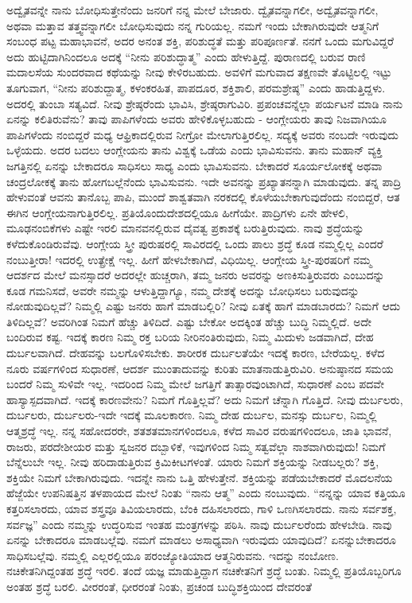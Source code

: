 ಅದ್ವೈತವನ್ನೇ ನಾನು ಬೋಧಿಸುತ್ತೇನೆಂದು ಜನರಿಗೆ ನನ್ನ ಮೇಲೆ ಬೇಜಾರು. ದ್ವೈತವನ್ನಾಗಲೀ, ಅದ್ವೈತವನ್ನಾಗಲೀ, ಅಥವಾ ಮತ್ತಾವ ತತ್ತ್ವವನ್ನಾಗಲೀ ಬೋಧಿಸುವುದು ನನ್ನ ಗುರಿಯಲ್ಲ. ನಮಗೆ ಇಂದು ಬೇಕಾಗಿರುವುದೇ ಆತ್ಮನಿಗೆ ಸಂಬಂಧ ಪಟ್ಟ ಮಹಾಭಾವನೆ, ಅದರ ಅನಂತ ಶಕ್ತಿ, ಪರಿಶುದ್ಧತೆ ಮತ್ತು ಪರಿಪೂರ್ಣತೆ. ನನಗೆ ಒಂದು ಮಗುವಿದ್ದರೆ ಅದು ಹುಟ್ಟಿದಾಗಿನಿಂದಲೂ ಅದಕ್ಕೆ “ನೀನು ಪರಿಶುದ್ಧಾತ್ಮ” ಎಂದು ಹೇಳುತ್ತಿದ್ದೆ. ಪುರಾಣದಲ್ಲಿ ಬರುವ ರಾಣಿ ಮದಾಲಸೆಯ ಸುಂದರವಾದ ಕಥೆಯನ್ನು ನೀವು ಕೇಳಿರಬಹುದು. ಅವಳಿಗೆ ಮಗುವಾದ ತಕ್ಷಣವೇ ತೊಟ್ಟಿಲಲ್ಲಿ ಇಟ್ಟು ತೂಗುವಾಗ, “ನೀನು ಪರಿಶುದ್ದಾತ್ಮ, ಕಳಂಕರಹಿತ, ಪಾಪದೂರ, ಶಕ್ತಿಶಾಲಿ, ಪರಮಶ್ರೇಷ್ಠ” ಎಂದು ಹಾಡುತ್ತಿದ್ದಳು. ಅದರಲ್ಲಿ ತುಂಬಾ ಸತ್ಯವಿದೆ. ನೀವು ಶ್ರೇಷ್ಠರೆಂದು ಭಾವಿಸಿ, ಶ್ರೇಷ್ಠರಾಗುವಿರಿ. ಪ್ರಪಂಚವನ್ನೆಲ್ಲಾ ಪರ್ಯಟನೆ ಮಾಡಿ ನಾನು ಏನನ್ನು ಕಲಿತಿರುವೆನು? ತಾವು ಪಾಪಿಗಳೆಂದು ಅವರು ಹೇಳಿಕೊಳ್ಳಬಹುದು - ಆಂಗ್ಲೇಯರು ತಾವು ನಿಜವಾಗಿಯೂ ಪಾಪಿಗಳೆಂದು ನಂಬಿದ್ದರೆ ಮಧ್ಯ ಆಫ್ರಿಕಾದಲ್ಲಿರುವ ನೀಗ್ರೋ ಮೇಲಾಗುತ್ತಿರಲಿಲ್ಲ. ಸದ್ಯಕ್ಕೆ ಅವರು ನಂಬದೇ ಇರುವುದು ಒಳ್ಳೆಯದು. ಅದರ ಬದಲು ಆಂಗ್ಲೇಯನು ತಾನು ವಿಶ್ವಕ್ಕೆ ಒಡೆಯ ಎಂದು ಭಾವಿಸುವನು. ತಾನು ಮಹಾನ್​ ವ್ಯಕ್ತಿ ಜಗತ್ತಿನಲ್ಲಿ ಏನನ್ನು ಬೇಕಾದರೂ ಸಾಧಿಸಲು ಸಾಧ್ಯ ಎಂದು ಭಾವಿಸುವನು. ಬೇಕಾದರೆ ಸೂರ್ಯಲೋಕಕ್ಕೆ ಅಥವಾ ಚಂದ್ರಲೋಕಕ್ಕೆ ತಾನು ಹೋಗಬಲ್ಲೆನೆಂದು ಭಾವಿಸುವನು. ಇದೇ ಅವನನ್ನು ಪ್ರಖ್ಯಾತನನ್ನಾಗಿ ಮಾಡುವುದು. ತನ್ನ ಪಾದ್ರಿ ಹೇಳುವಂತೆ ಆವನು ತಾನೊಬ್ಬ ಪಾಪಿ, ಮುಂದೆ ಶಾಶ್ವತವಾಗಿ ನರಕದಲ್ಲಿ ಕೊಳೆಯಬೇಕಾಗುವುದೆಂದು ನಂಬಿದ್ದರೆ, ಆತ ಈಗಿನ ಆಂಗ್ಲೇಯನಾಗುತ್ತಿರಲಿಲ್ಲ. ಪ್ರತಿಯೊಂದು\break ದೇಶದಲ್ಲಿಯೂ ಹೀಗೆಯೇ. ಪಾದ್ರಿಗಳು ಏನೇ ಹೇಳಲಿ, ಮೂಢನಂಬಿಕೆಗಳು ಎಷ್ಟೇ ಇರಲಿ ಮಾನವನಲ್ಲಿರುವ ದೈವತ್ವ ಪ್ರಕಾಶಕ್ಕೆ ಬರುತ್ತಿರುವುದು. ನಾವು ಶ್ರದ್ಧೆಯನ್ನು ಕಳೆದುಕೊಂಡಿರುವೆವು. ಆಂಗ್ಲೇಯ ಸ್ತ್ರೀ ಪುರುಷರಲ್ಲಿ ಸಾವಿರದಲ್ಲಿ ಒಂದು ಪಾಲು ಶ್ರದ್ಧೆ ಕೂಡ ನಮ್ಮಲ್ಲಿಲ್ಲ ಎಂದರೆ ನಂಬುತ್ತೀರಾ! ಇದರಲ್ಲಿ ಉತ್ಪ್ರೇಕ್ಷೆ ಇಲ್ಲ. ಹೀಗೆ ಹೇಳಬೇಕಾಗಿದೆ, ವಿಧಿಯಿಲ್ಲ. ಆಂಗ್ಲೇಯ ಸ್ತ್ರೀ-ಪುರಷರಿಗೆ ನಮ್ಮ ಆದರ್ಶದ ಮೇಲೆ ಮನಸ್ಸಾದರೆ ಅದರಲ್ಲೇ ಹುಚ್ಚರಾಗಿ, ತಮ್ಮ ಜನರು ಅವರನ್ನು ಅಣಕಿಸುತ್ತಿರುವರು ಎಂಬುದನ್ನು ಕೂಡ ಗಮನಿಸದೆ, ಅವರೇ ನಮ್ಮನ್ನು ಆಳುತ್ತಿದ್ದಾಗ್ಯೂ, ನಮ್ಮ ದೇಶಕ್ಕೆ ಅದನ್ನು ಬೋಧಿಸಲು ಬರುವುದನ್ನು ನೋಡುವುದಿಲ್ಲವೆ? ನಿಮ್ಮಲ್ಲಿ ಎಷ್ಟು ಜನರು ಹಾಗೆ ಮಾಡಬಲ್ಲಿರಿ? ನೀವು ಏತಕ್ಕೆ ಹಾಗೆ ಮಾಡಬಾರದು? ನಿಮಗೆ ಆದು ತಿಳಿದಿಲ್ಲವೆ? ಅವರಿಗಿಂತ ನಿಮಗೆ ಹೆಚ್ಚು ತಿಳಿದಿದೆ. ಎಷ್ಟು ಬೇಕೋ ಅದಕ್ಕಿಂತ ಹೆಚ್ಚು ಬುದ್ಧಿ ನಿಮ್ಮಲ್ಲಿದೆ. ಅದೇ ಬಂದಿರುವ ಕಷ್ಟ. ಇದಕ್ಕೆ ಕಾರಣ ನಿಮ್ಮ ರಕ್ತ ಬರಿಯ ನೀರಿನಂತಿರುವುದು, ನಿಮ್ಮ ಮಿದುಳು ಜಡವಾಗಿದೆ, ದೇಹ ದುರ್ಬಲವಾಗಿದೆ. ದೇಹವನ್ನು ಬಲಗೊಳಿಸಬೇಕು. ಶಾರೀರಕ ದುರ್ಬಲತೆಯೇ ಇದಕ್ಕೆ ಕಾರಣ, ಬೇರೆಯಲ್ಲ. ಕಳೆದ ನೂರು ವರ್ಷಗಳಿಂದ ಸುಧಾರಣೆ, ಆದರ್ಶ ಮುಂತಾದುವನ್ನು ಕುರಿತು ಮಾತನಾಡುತ್ತಿರುವಿರಿ. ಅನುಷ್ಠಾನದ ಸಮಯ ಬಂದರೆ ನಿಮ್ಮ ಸುಳಿವೇ ಇಲ್ಲ. ಇದರಿಂದ ನಿಮ್ಮ ಮೇಲೆ ಜಗತ್ತಿಗೆ ತಾತ್ಸಾರವುಂಟಾಗಿದೆ, ಸುಧಾರಣೆ ಎಂಬ ಪದವೇ ಹಾಸ್ಯಾಸ್ಪದವಾಗಿದೆ. ಇದಕ್ಕೆ ಕಾರಣವೇನು? ನಿಮಗೆ ಗೊತ್ತಿಲ್ಲವೆ? ಅದು ನಿಮಗೆ ಚೆನ್ನಾಗಿ ಗೊತ್ತಿದೆ. ನೀವು ದುರ್ಬಲರು, ದುರ್ಬಲರು, ದುರ್ಬಲರು-ಇದೇ ಇದಕ್ಕೆ ಮೂಲಕಾರಣ. ನಿಮ್ಮ ದೇಹ ದುರ್ಬಲ, ಮನಸ್ಸು ದುರ್ಬಲ, ನಿಮ್ಮಲ್ಲಿ ಆತ್ಮಶ್ರದ್ಧೆ ಇಲ್ಲ. ನನ್ನ ಸಹೋದರರೇ, ಶತಶತಮಾನಗಳಿಂದಲೂ, ಕಳೆದ ಸಾವಿರ ವರುಷಗಳಿಂದಲೂ, ಜಾತಿ ಭಾವನೆ, ರಾಜರು, ಪರದೇಶೀಯರ ಮತ್ತು ಸ್ವಜನರ ದಬ್ಬಾಳಿಕೆ, ಇವುಗಳಿಂದ ನಿಮ್ಮ ಸತ್ವವೆಲ್ಲಾ ನಾಶವಾಗಿರುವುದು! ನಿಮಗೆ ಬೆನ್ನೆಲುಬೇ ಇಲ್ಲ. ನೀವು ಹರಿದಾಡುತ್ತಿರುವ ಕ್ರಿಮಿಕೀಟಗಳಂತೆ. ಯಾರು ನಿಮಗೆ ಶಕ್ತಿಯನ್ನು ನೀಡಬಲ್ಲರು? ಶಕ್ತಿ, ಶಕ್ತಿಯೇ ನಿಮಗೆ ಬೇಕಾಗಿರುವುದು. ಇದನ್ನೇ ನಾನು ಒತ್ತಿ ಹೇಳುತ್ತೇನೆ. ಶಕ್ತಿಯನ್ನು ಪಡೆಯಬೇಕಾದರೆ ಮೊದಲನೆಯ ಹೆಜ್ಜೆಯೇ ಉಪನಿಷತ್ತಿನ ತಳಪಾಯದ ಮೇಲೆ ನಿಂತು “ನಾನು ಆತ್ಮ” ಎಂದು ನಂಬುವುದು. “ನನ್ನನ್ನು ಯಾವ ಕತ್ತಿಯೂ ಕತ್ತರಿಸಲಾರದು, ಯಾವ ಶಸ್ತ್ರವೂ ತಿವಿಯಲಾರದು, ಬೆಂಕಿ ದಹಿಸಲಾರದು, ಗಾಳಿ ಒಣಗಿಸಲಾರದು. ನಾನು ಸರ್ವಶಕ್ತ, ಸರ್ವಜ್ಞ” ಎಂದು ನಮ್ಮನ್ನು ಉದ್ಧರಿಸುವ ಇಂತಹ ಮಂತ್ರಗಳನ್ನು ಪಠಿಸಿ. ನಾವು ದುರ್ಬಲರೆಂದು ಹೇಳಬೇಡಿ. ನಾವು ಏನನ್ನು ಬೇಕಾದರೂ ಮಾಡಬಲ್ಲೆವು. ನಮಗೆ ಮಾಡಲು ಅಸಾಧ್ಯವಾಗಿ ಇರುವುದು ಯಾವುದಿದೆ? ಏನನ್ನುಬೇಕಾದರೂ ಸಾಧಿಸಬಲ್ಲೆವು. ನಮ್ಮಲ್ಲಿ ಎಲ್ಲರಲ್ಲಿಯೂ ಪರಂಜ್ಯೋತಿಯಾದ ಆತ್ಮನಿರುವನು. ಇದನ್ನು ನಂಬೋಣ. ನಚಿಕೇತನಿಗಿದ್ದಂತಹ ಶ್ರದ್ಧೆ ಇರಲಿ. ತಂದೆ ಯಜ್ಞ ಮಾಡುತ್ತಿದ್ದಾಗ ನಚಿಕೇತನಿಗೆ ಶ್ರದ್ಧೆ ಬಂತು. ನಿಮ್ಮಲ್ಲಿ ಪ್ರತಿಯೊಬ್ಬರಿಗೂ ಅಂತಹ ಶ್ರದ್ಧೆ ಬರಲಿ. ವೀರರಂತೆ, ಧೀರರಂತೆ ನಿಂತು, ಪ್ರಚಂಡ ಬುದ್ಧಿಶಕ್ತಿಯಿಂದ ದೇವರಂತೆ 